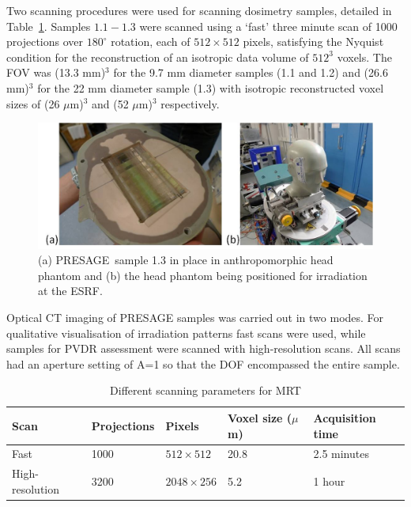 	Two scanning procedures were used for scanning dosimetry samples, detailed in Table~\ref{table:scansettings}. Samples $1.1−1.3$ were scanned using a `fast' three minute scan of 1000 projections over $180^{\circ}$ rotation, each of $512 \times 512$ pixels, satisfying the Nyquist condition for the reconstruction of an isotropic data volume of $512^3$ voxels. The FOV was (13.3 mm)$^3$ for the 9.7 mm diameter samples (1.1 and 1.2) and (26.6 mm)$^3$ for the 22 mm diameter sample (1.3) with isotropic reconstructed voxel sizes of (26 $\mu$m)$^3$ and (52 $\mu$m)$^3$ respectively.
	
	\begin{figure}
		\centering
		\includegraphics[width=0.9\linewidth]{mrt_img/mrt_Fig1}
		\caption{(a) PRESAGE\textregistered \ sample 1.3 in place in anthropomorphic head phantom and (b) the head phantom being positioned for irradiation at the ESRF.}
		\label{fig:Fig1christopher}
	\end{figure}
	

	
	
	Optical CT imaging of PRESAGE samples was carried out in two modes.
	For qualitative visualisation of irradiation patterns fast scans were used, while samples for PVDR assessment were scanned with high-resolution scans. All scans had an aperture setting of A=1 so that the DOF encompassed the entire sample.
	
	
	
	\begin{table}[H]
		\centering
		\begin{tabular}{ p{2.3cm}  p{2.5cm} p{2.5cm}  p{2.3cm} p{2.5cm}  }
			\hline
			\textbf{Scan} & \textbf{Projections} &\textbf{Pixels}   &\textbf{Voxel size ($\mu$m)} & \textbf{Acquisition time} \\ \hline 
			Fast  & 1000 & $512\times 512$  & 20.8 & 2.5 minutes \\ %
			High-resolution & 3200 & $2048\times 256$ &  5.2 & 1 hour \\ 
			\hline
		\end{tabular}
		\caption{Different scanning parameters for MRT}
		\label{table:scansettings}
	\end{table}
	
